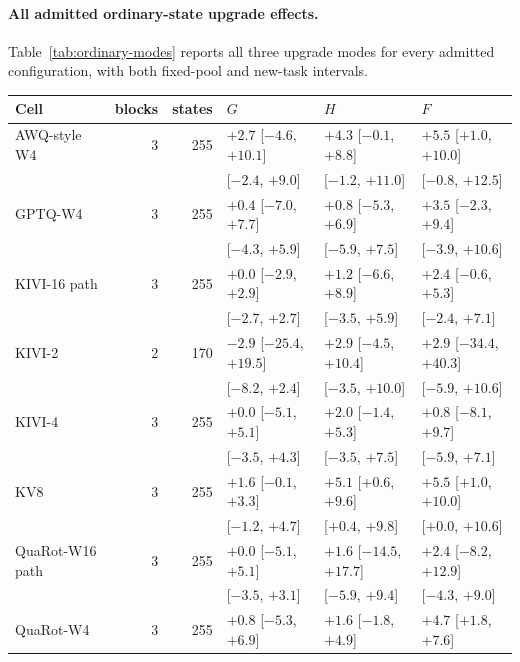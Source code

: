 \paragraph{All admitted ordinary-state upgrade effects.} Table~\ref{tab:ordinary-modes} reports all three upgrade modes for every admitted configuration, with both fixed-pool and new-task intervals.
\begin{table}[t]
\centering%
\renewcommand{\arraystretch}{1.12}\fontsize{8.5}{10}\selectfont\setlength{\tabcolsep}{4pt}
\begin{tabular}{@{}lrrlll@{}}
\toprule
Cell & blocks & states & $G$ & $H$ & $F$ \\
\midrule
AWQ-style W4 & 3 & 255 & $+2.7$ [$-4.6$, $+10.1$] & $+4.3$ [$-0.1$, $+8.8$] & $+5.5$ [$+1.0$, $+10.0$] \\
 & & & [$-2.4$, $+9.0$] & [$-1.2$, $+11.0$] & [$-0.8$, $+12.5$] \\
GPTQ-W4 & 3 & 255 & $+0.4$ [$-7.0$, $+7.7$] & $+0.8$ [$-5.3$, $+6.9$] & $+3.5$ [$-2.3$, $+9.4$] \\
 & & & [$-4.3$, $+5.9$] & [$-5.9$, $+7.5$] & [$-3.9$, $+10.6$] \\
KIVI-16 path & 3 & 255 & $+0.0$ [$-2.9$, $+2.9$] & $+1.2$ [$-6.6$, $+8.9$] & $+2.4$ [$-0.6$, $+5.3$] \\
 & & & [$-2.7$, $+2.7$] & [$-3.5$, $+5.9$] & [$-2.4$, $+7.1$] \\
KIVI-2 & 2 & 170 & $-2.9$ [$-25.4$, $+19.5$] & $+2.9$ [$-4.5$, $+10.4$] & $+2.9$ [$-34.4$, $+40.3$] \\
 & & & [$-8.2$, $+2.4$] & [$-3.5$, $+10.0$] & [$-5.9$, $+10.6$] \\
KIVI-4 & 3 & 255 & $+0.0$ [$-5.1$, $+5.1$] & $+2.0$ [$-1.4$, $+5.3$] & $+0.8$ [$-8.1$, $+9.7$] \\
 & & & [$-3.5$, $+4.3$] & [$-3.5$, $+7.5$] & [$-5.9$, $+7.1$] \\
KV8 & 3 & 255 & $+1.6$ [$-0.1$, $+3.3$] & $+5.1$ [$+0.6$, $+9.6$] & $+5.5$ [$+1.0$, $+10.0$] \\
 & & & [$-1.2$, $+4.7$] & [$+0.4$, $+9.8$] & [$+0.0$, $+10.6$] \\
QuaRot-W16 path & 3 & 255 & $+0.0$ [$-5.1$, $+5.1$] & $+1.6$ [$-14.5$, $+17.7$] & $+2.4$ [$-8.2$, $+12.9$] \\
 & & & [$-3.5$, $+3.1$] & [$-5.9$, $+9.4$] & [$-4.3$, $+9.0$] \\
QuaRot-W4 & 3 & 255 & $+0.8$ [$-5.3$, $+6.9$] & $+1.6$ [$-1.8$, $+4.9$] & $+4.7$ [$+1.8$, $+7.6$] \\

\end{tabular}
\end{table}
